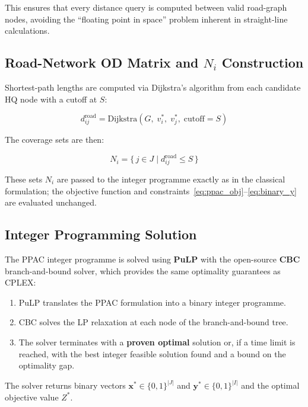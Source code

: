 \documentclass[12pt]{article}
\begin{document}
This ensures that every distance query is computed between valid road-graph
nodes, avoiding the ``floating point in space'' problem inherent in
straight-line calculations.

\subsection{Road-Network OD Matrix and $N_i$ Construction}

Shortest-path lengths are computed via Dijkstra's algorithm from each
candidate HQ node with a cutoff at $S$:

\begin{equation}
    d^{\mathrm{road}}_{ij} =
    \text{Dijkstra}\!\left(G,\; v^*_i,\; v^*_j,\; \text{cutoff}=S\right)
    \label{eq:dijkstra}
\end{equation}

The coverage sets are then:

\begin{equation}
    N_i = \bigl\{\, j \in J \;\big|\; d^{\mathrm{road}}_{ij} \le S \,\bigr\}
    \label{eq:Ni_road}
\end{equation}

These sets $N_i$ are passed to the integer programme exactly as in the
classical formulation; the objective function and
constraints~\eqref{eq:ppac_obj}--\eqref{eq:binary_y} are evaluated unchanged.

\subsection{Integer Programming Solution}

The PPAC integer programme is solved using \textbf{PuLP} with the open-source
\textbf{CBC} branch-and-bound solver, which provides the same optimality
guarantees as CPLEX:

\begin{enumerate}
    \item PuLP translates the PPAC formulation into a binary integer programme.
    \item CBC solves the LP relaxation at each node of the branch-and-bound tree.
    \item The solver terminates with a \textbf{proven optimal} solution or,
          if a time limit is reached, with the best integer feasible solution
          found and a bound on the optimality gap.
\end{enumerate}

The solver returns binary vectors $\mathbf{x}^* \in \{0,1\}^{|J|}$ and
$\mathbf{y}^* \in \{0,1\}^{|I|}$ and the optimal objective value $Z^*$.
\end{document}
